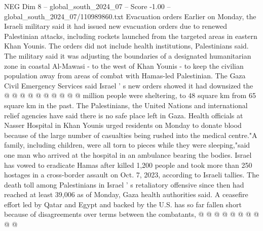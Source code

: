 \begin{textsample}{NEG Dim 8 – global\_south\_2024\_07 – Score -1.00 – global\_south\_2024\_07/110989860.txt}
Evacuation orders Earlier on Monday, the Israeli military said it had issued new evacuation orders due to renewed Palestinian attacks, including rockets launched from the targeted areas in eastern Khan Younis.
The orders did not include health institutions, Palestinians said.
The military said it was adjusting the boundaries of a designated humanitarian zone in coastal Al-Mawasi - to the west of Khan Younis - to keep the civilian population away from areas of combat with Hamas-led Palestinian.
The Gaza Civil Emergency Services said Israel ' s new orders showed it had downsized the @ @ @ @ @ @ @ @ @ @ million people were sheltering, to 48 square km from 65 square km in the past.
The Palestinians, the United Nations and international relief agencies have said there is no safe place left in Gaza.
Health officials at Nasser Hospital in Khan Younis urged residents on Monday to donate blood because of the large number of casualties being rushed into the medical centre."A family, including children, were all torn to pieces while they were sleeping,"said one man who arrived at the hospital in an ambulance bearing the bodies.
Israel has vowed to eradicate Hamas after killed 1,200 people and took more than 250 hostages in a cross-border assault on Oct. 7, 2023, according to Israeli tallies.
The death toll among Palestinians in Israel ' s retaliatory offensive since then had reached at least 39,006 as of Monday, Gaza health authorities said.
A ceasefire effort led by Qatar and Egypt and backed by the U.S. has so far fallen short because of disagreements over terms between the combatants, @ @ @ @ @ @ @ @ @ @

\end{textsample}
